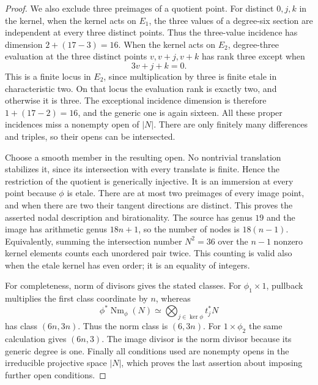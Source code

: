 \begin{proof}
We also exclude three preimages of a quotient point.
For distinct $0,j,k$ in the kernel, when the kernel acts on
$E_1$, the three values of a degree-six section are independent
at every three distinct points.  Thus the three-value incidence
has dimension $2+(17-3)=16$.
When the kernel acts on $E_2$, degree-three evaluation at the
three distinct points $v,v+j,v+k$ has rank three except when
\[
                              3v+j+k=0.
\]
This is a finite locus in $E_2$, since multiplication by three
is finite etale in characteristic two.  On that locus the
evaluation rank is exactly two, and otherwise it is three.
The exceptional incidence dimension is therefore
$1+(17-2)=16$, and the generic one is again sixteen.
All these proper incidences miss a nonempty open of $|N|$.
There are only finitely many differences and triples, so their
opens can be intersected.

Choose a smooth member in the resulting open.
No nontrivial translation stabilizes it, since its intersection
with every translate is finite.  Hence the restriction of the
quotient is generically injective.  It is an immersion at every
point because $\phi$ is etale.  There are at most two preimages
of every image point, and when there are two their tangent
directions are distinct.  This proves the asserted nodal
description and birationality.
The source has genus $19$ and the image has arithmetic genus
$18n+1$, so the number of nodes is $18(n-1)$.
Equivalently, summing the intersection number
$N^2=36$ over the $n-1$ nonzero kernel elements counts each
unordered pair twice.  This counting is valid also when the
etale kernel has even order; it is an equality of integers.

For completeness, norm of divisors gives the stated classes.
For $\phi_1\times1$, pullback multiplies the first class
coordinate by $n$, whereas
\[
       \phi^*\operatorname{Nm}_{\phi}(N)
           \simeq\bigotimes_{j\in\ker\phi}t_j^*N
\]
has class $(6n,3n)$.
Thus the norm class is $(6,3n)$.
For $1\times\phi_2$ the same calculation gives $(6n,3)$.
The image divisor is the norm divisor because its generic
degree is one.  Finally all conditions used are nonempty opens
in the irreducible projective space $|N|$, which proves the
last assertion about imposing further open conditions.
\end{proof}

